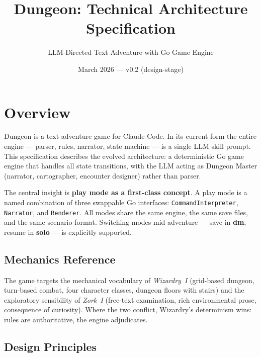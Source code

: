 \documentclass[a4paper,10pt]{article}
\newcommand{\iface}[1]{\texttt{#1}}
\newcommand{\mode}[1]{\textbf{#1}}
\begin{document}
\title{Dungeon: Technical Architecture Specification}
\author{LLM-Directed Text Adventure with Go Game Engine}
\date{March 2026 --- v0.2 (design-stage)}
\maketitle

\tableofcontents
\newpage

\section{Overview}

Dungeon is a text adventure game for Claude Code.  In its current
form the entire engine --- parser, rules, narrator, state machine ---
is a single LLM skill prompt.  This specification describes the
evolved architecture: a deterministic Go game engine that handles
all state transitions, with the LLM acting as Dungeon Master
(narrator, cartographer, encounter designer) rather than parser.

The central insight is \textbf{play mode as a first-class concept}.
A play mode is a named combination of three swappable Go interfaces:
\iface{CommandInterpreter}, \iface{Narrator}, and \iface{Renderer}.
All modes share the same engine, the same save files, and the same
scenario format.  Switching modes mid-adventure --- save in
\mode{dm}, resume in \mode{solo} --- is explicitly supported.

\subsection{Mechanics Reference}

The game targets the mechanical vocabulary of \emph{Wizardry~I}
(grid-based dungeon, turn-based combat, four character classes,
dungeon floors with stairs) and the exploratory sensibility of
\emph{Zork~I} (free-text examination, rich environmental prose,
consequence of curiosity).  Where the two conflict, Wizardry's
determinism wins: rules are authoritative, the engine adjudicates.

\subsection{Design Principles}
\end{document}
